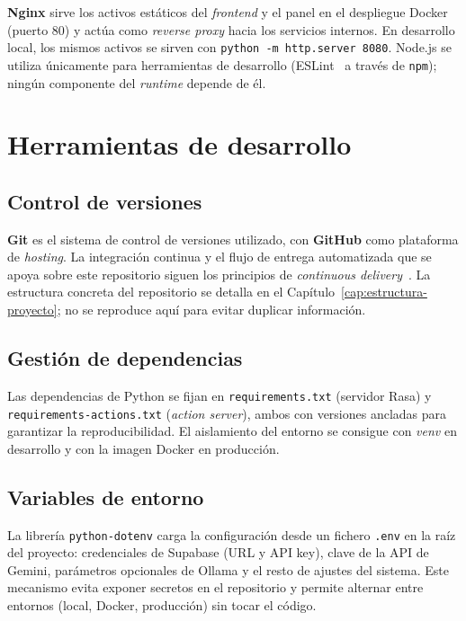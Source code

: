 \textbf{Nginx} sirve los activos estáticos del \textit{frontend} y el panel en el despliegue Docker (puerto 80) y actúa como \textit{reverse proxy} hacia los servicios internos. En desarrollo local, los mismos activos se sirven con \texttt{python -m http.server 8080}. Node.js se utiliza únicamente para herramientas de desarrollo (ESLint~\cite{eslint} a través de \texttt{npm}); ningún componente del \textit{runtime} depende de él.

\section{Herramientas de desarrollo}\label{sec:herramientas-desarrollo-marco}

\subsection{Control de versiones}

\textbf{Git} es el sistema de control de versiones utilizado, con \textbf{GitHub} como plataforma de \textit{hosting}. La integración continua y el flujo de entrega automatizada que se apoya sobre este repositorio siguen los principios de \textit{continuous delivery}~\cite{humble2010continuous}. La estructura concreta del repositorio se detalla en el Capítulo~\ref{cap:estructura-proyecto}; no se reproduce aquí para evitar duplicar información.

\subsection{Gestión de dependencias}

Las dependencias de Python se fijan en \texttt{requirements.txt} (servidor Rasa) y \texttt{requirements-actions.txt} (\textit{action server}), ambos con versiones ancladas para garantizar la reproducibilidad. El aislamiento del entorno se consigue con \textit{venv} en desarrollo y con la imagen Docker en producción.

\subsection{Variables de entorno}

La librería \texttt{python-dotenv} carga la configuración desde un fichero \texttt{.env} en la raíz del proyecto: credenciales de Supabase (URL y API key), clave de la API de Gemini, parámetros opcionales de Ollama y el resto de ajustes del sistema. Este mecanismo evita exponer secretos en el repositorio y permite alternar entre entornos (local, Docker, producción) sin tocar el código.

